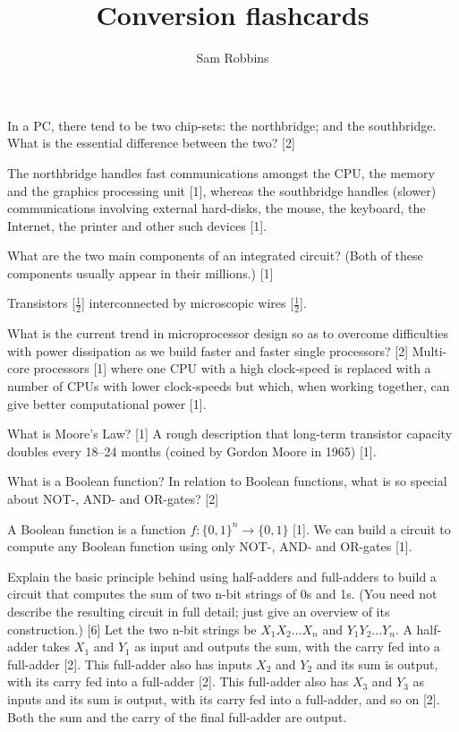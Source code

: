 \documentclass[grid,avery5371]{flashcards}
\title{Conversion flashcards}
\author{Sam Robbins}
\begin{document}
\begin{flashcard}[]{In a PC, there tend to be two chip-sets: the northbridge; and the
southbridge. What is the essential difference between the two? [2]}

The northbridge handles fast communications amongst the CPU, the
memory and the graphics processing unit [1], whereas the southbridge
handles (slower) communications involving external hard-disks, the
mouse, the keyboard, the Internet, the printer and other such devices
[1].
\end{flashcard}

\begin{flashcard}[]{ What are the two main components of an integrated circuit? (Both of
these components usually appear in their millions.) [1]}

Transistors [$\frac{1}{2}$] interconnected by microscopic wires [$\frac{1}{2}$].
\end{flashcard}

\begin{flashcard}[]{What is the current trend in microprocessor design so as to overcome
difficulties with power dissipation as we build faster and faster single
processors? [2]}
Multi-core processors [1] where one CPU with a high clock-speed is
replaced with a number of CPUs with lower clock-speeds but which,
when working together, can give better computational power [1].
\end{flashcard}

\begin{flashcard}[]{What is Moore’s Law? [1]}
A rough description that long-term transistor capacity doubles every
18–24 months (coined by Gordon Moore in 1965) [1].
\end{flashcard}

\begin{flashcard}[]{What is a Boolean function? In relation to Boolean functions, what is
so special about NOT-, AND- and OR-gates? [2]}

A Boolean function is a function $f:\{0, 1\}^n \rightarrow \{0, 1\}$ [1]. We can build
a circuit to compute any Boolean function using only NOT-, AND- and
OR-gates [1].

\end{flashcard}

\begin{flashcard}[]{
Explain the basic principle behind using half-adders and full-adders to
build a circuit that computes the sum of two n-bit strings of 0s and 1s.
(You need not describe the resulting circuit in full detail; just give an
overview of its construction.) [6]
}
{\small Let the two n-bit strings be $X_1X_2 ... X_n$ and $Y_1Y_2 . . . Y_n$. A half-adder
takes $X_1$ and $Y_1$ as input and outputs the sum, with the carry fed into
a full-adder [2]. This full-adder also has inputs $X_2$ and $Y_2$ and its sum
is output, with its carry fed into a full-adder [2]. This full-adder also
has $X_3$ and $Y_3$ as inputs and its sum is output, with its carry fed into
a full-adder, and so on [2]. Both the sum and the carry of the final
full-adder are output.}

\end{flashcard}
\end{document}
